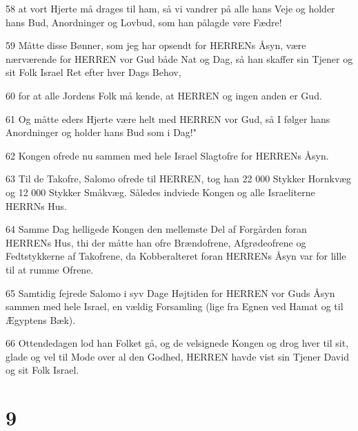 \par 58 at vort Hjerte må drages til ham, så vi vandrer på alle hans Veje og holder hans Bud, Anordninger og Lovbud, som han pålagde vøre Fædre!
\par 59 Måtte disse Bønner, som jeg har opsendt for HERRENs Åsyn, være nærværende for HERREN vor Gud både Nat og Dag, så han skaffer sin Tjener og sit Folk Israel Ret efter hver Dags Behov,
\par 60 for at alle Jordens Folk må kende, at HERREN og ingen anden er Gud.
\par 61 Og måtte eders Hjerte være helt med HERREN vor Gud, så I følger hans Anordninger og holder hans Bud som i Dag!"
\par 62 Kongen ofrede nu sammen med hele Israel Slagtofre for HERRENs Åsyn.
\par 63 Til de Takofre, Salomo ofrede til HERREN, tog han 22 000 Stykker Hornkvæg og 12 000 Stykker Småkvæg. Således indviede Kongen og alle Israeliterne HERRNs Hus.
\par 64 Samme Dag helligede Kongen den mellemste Del af Forgården foran HERRENs Hus, thi der måtte han ofre Brændofrene, Afgrødeofrene og Fedtstykkerne af Takofrene, da Kobberalteret foran HERRENs Åsyn var for lille til at rumme Ofrene.
\par 65 Samtidig fejrede Salomo i syv Dage Højtiden for HERREN vor Guds Åsyn sammen med hele Israel, en vældig Forsamling (lige fra Egnen ved Hamat og til Ægyptens Bæk).
\par 66 Ottendedagen lod han Folket gå, og de velsignede Kongen og drog hver til sit, glade og vel til Mode over al den Godhed, HERREN havde vist sin Tjener David og sit Folk Israel.

\chapter{9}

